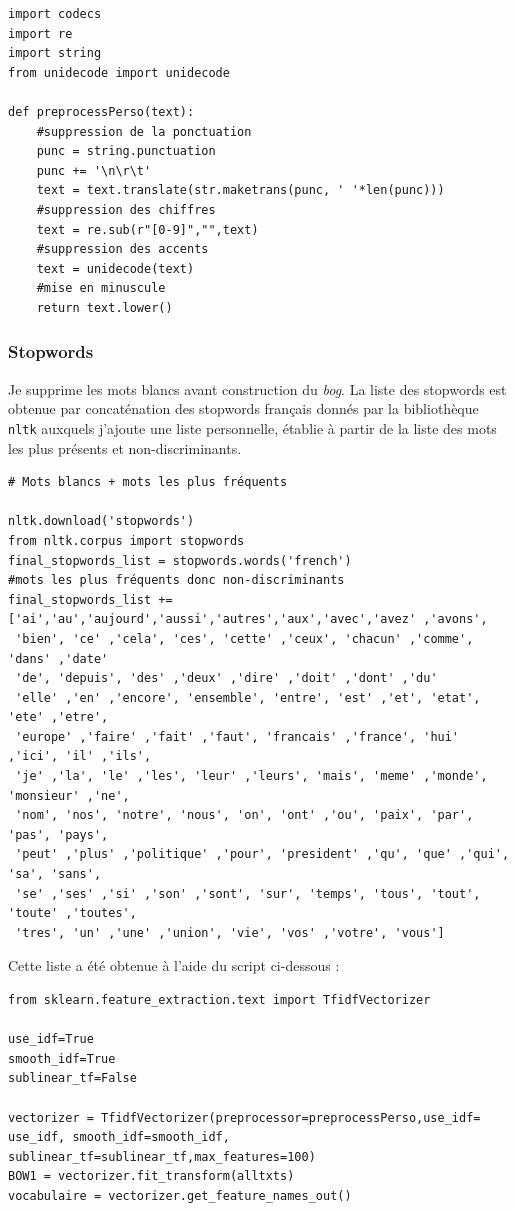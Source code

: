 \documentclass[a4paper,12pt]{article}
\begin{document}
\begin{lstlisting}
import codecs
import re 
import string
from unidecode import unidecode

def preprocessPerso(text): 
    #suppression de la ponctuation
    punc = string.punctuation
    punc += '\n\r\t'
    text = text.translate(str.maketrans(punc, ' '*len(punc)))
    #suppression des chiffres
    text = re.sub(r"[0-9]","",text)
    #suppression des accents
    text = unidecode(text)
    #mise en minuscule
    return text.lower()
\end{lstlisting}
\subsubsection{Stopwords}
Je supprime les mots blancs avant construction du \textit{bog}. La liste des stopwords est obtenue par concaténation des stopwords français donnés par la bibliothèque \texttt{nltk} auxquels j'ajoute une liste personnelle, établie à partir de la liste des mots les plus présents et non-discriminants.

\begin{lstlisting}
# Mots blancs + mots les plus fréquents

nltk.download('stopwords')
from nltk.corpus import stopwords
final_stopwords_list = stopwords.words('french')
#mots les plus fréquents donc non-discriminants
final_stopwords_list += ['ai','au','aujourd','aussi','autres','aux','avec','avez' ,'avons',
 'bien', 'ce' ,'cela', 'ces', 'cette' ,'ceux', 'chacun' ,'comme', 'dans' ,'date'
 'de', 'depuis', 'des' ,'deux' ,'dire' ,'doit' ,'dont' ,'du'
 'elle' ,'en' ,'encore', 'ensemble', 'entre', 'est' ,'et', 'etat', 'ete' ,'etre',
 'europe' ,'faire' ,'fait' ,'faut', 'francais' ,'france', 'hui' ,'ici', 'il' ,'ils',
 'je' ,'la', 'le' ,'les', 'leur' ,'leurs', 'mais', 'meme' ,'monde', 'monsieur' ,'ne',
 'nom', 'nos', 'notre', 'nous', 'on', 'ont' ,'ou', 'paix', 'par', 'pas', 'pays',
 'peut' ,'plus' ,'politique' ,'pour', 'president' ,'qu', 'que' ,'qui', 'sa', 'sans',
 'se' ,'ses' ,'si' ,'son' ,'sont', 'sur', 'temps', 'tous', 'tout', 'toute' ,'toutes',
 'tres', 'un' ,'une' ,'union', 'vie', 'vos' ,'votre', 'vous']
\end{lstlisting}

Cette liste a été obtenue à l'aide du script ci-dessous :
\begin{lstlisting}
from sklearn.feature_extraction.text import TfidfVectorizer

use_idf=True
smooth_idf=True
sublinear_tf=False

vectorizer = TfidfVectorizer(preprocessor=preprocessPerso,use_idf= use_idf, smooth_idf=smooth_idf, sublinear_tf=sublinear_tf,max_features=100)
BOW1 = vectorizer.fit_transform(alltxts)
vocabulaire = vectorizer.get_feature_names_out()
\end{lstlisting} 
\end{document}
